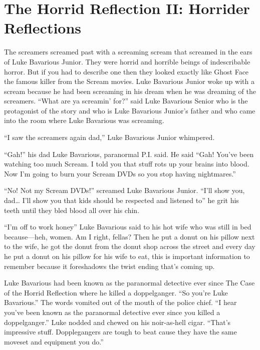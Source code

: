 \chapter[Horrider Reflections]{The Horrid Reflection II: Horrider Reflections}


The screamers screamed past with a screaming scream that screamed
in the ears of Luke Bavarious Junior. They were horrid and horrible
beings of indescribable horror. But if you had to describe one then
they looked exactly like Ghost Face the famous killer from the
Scream movies. Luke Bavarious Junior woke up with a scream because
he had been screaming in his dream when he was dreaming of the
screamers. ``What are ya screamin' for?'' said Luke
Bavarious Senior who is the protagonist of the story and who is
Luke Bavarious Junior's father and who came into the room
where Luke Bavarious was screaming.

``I saw the screamers again dad,'' Luke Bavarious Junior
whimpered.

``Gah!'' his dad Luke Bavarious, paranormal P.I. said. He
said ``Gah! You've been watching too much Scream. I told
you that stuff rots up your brains into blood. Now I'm going
to burn your Scream DVDs so you stop having
nightmares.''

``No! Not my Scream DVDs!'' screamed Luke Bavarious
Junior. ``I'll show you, dad{\ldots} I'll show you
that kids should be respected and listened to'' he grit his
teeth until they bled blood all over his chin.



``I'm off to work honey'' Luke Bavarious said to
his hot wife who was still in bed because---heh, women. Am I
right, fellas? Then he put a donut on his pillow next to the wife,
he got the donut from the donut shop across the street and every
day he put a donut on his pillow for his wife to eat, this is
important information to remember because it foreshadows the twist
ending that's coming up.



Luke Bavarious had been known as the paranormal detective ever
since The Case of the Horrid Reflection where he killed a
doppelganger. ``So you're Luke Bavarious.'' The
words vomited out of the mouth of the police chief. ``I hear
you've been known as the paranormal detective ever since you
killed a doppelganger.'' Luke nodded and chewed on his
noir-as-hell cigar. ``That's impressive stuff.
Dopplegangers are tough to beat cause they have the same moveset
and equipment you do.''

